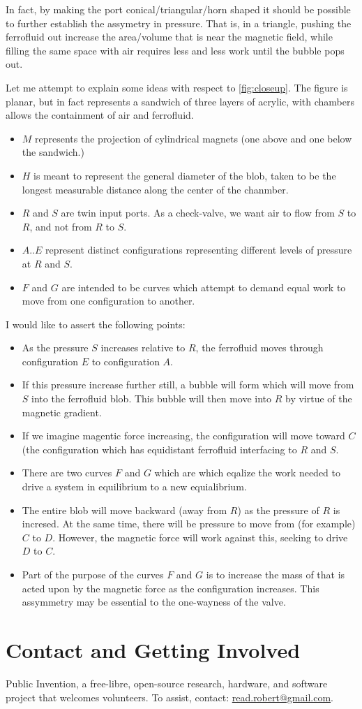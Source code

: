 \documentclass{article}
\begin{document}
In fact, by making the port conical/triangular/horn shaped it should be possible to further establish the assymetry in pressure.
That is, in a triangle, pushing the ferrofluid out increase the area/volume that is near the magnetic field, while filling the
same space with air requires less and less work until the bubble pops out.


Let me attempt to explain some ideas with respect to \ref{fig:closeup}.
The figure is planar, but in fact represents a sandwich of three layers of acrylic, with chambers allows the containment of air
and ferrofluid.
\begin{itemize}
\item $M$ represents the projection of cylindrical magnets (one above and one below the sandwich.)
\item $H$ is meant to represent the general diameter of the blob, taken to be the longest measurable distance along
  the center of the chanmber.
\item $R$ and $S$ are twin input ports. As a check-valve, we want air to flow from $S$ to $R$, and not from $R$ to $S$.
\item $A..E$ represent distinct configurations representing different levels of pressure at $R$ and $S$.
  \item $F$ and $G$ are intended to be curves which attempt to demand equal work to move from one configuration to another.
  \end{itemize}

I would like to assert the following points:
\begin{itemize}
\item As the pressure $S$ increases relative to $R$, the ferrofluid moves through configuration $E$ to configuration $A$.
  \item If this pressure increase further still, a bubble will form which will move from $S$ into the ferrofluid blob.
    This bubble will then move into $R$ by virtue of the magnetic gradient.
  \item If we imagine magentic force increasing, the configuration will move toward $C$ (the configuration which has
    equidistant ferrofluid interfacing to $R$ and $S$.
  \item There are two curves $F$ and $G$ which are which eqalize the work needed to drive a system in equilibrium to
    a new equialibrium.
  \item The entire blob will move backward (away from $R$) as the pressure of $R$ is incresed.  At the same time,
    there will be pressure to move from (for example) $C$ to $D$.  However, the magnetic force will work against
    this, seeking to drive $D$ to $C$.
  \item Part of the purpose of the curves $F$ and $G$ is to increase the mass of that is acted upon by the magnetic
    force as the configuration increases. This assymmetry may be essential to the one-wayness of the valve.
  \end{itemize}

\section{Contact and Getting Involved}

Public Invention,
a free-libre, open-source research, hardware, and software project that welcomes volunteers.
To assist, contact:
\href{mailto:read.robert@gmail.com}{read.robert@gmail.com}.



\end{document}
